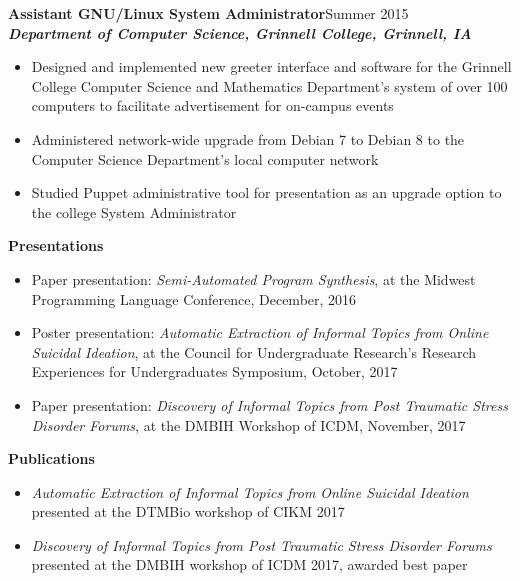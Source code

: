 \documentclass[9pt]{extarticle}
\begin{document}
\textbf{Assistant GNU/Linux System Administrator}\hfill Summer 2015\\
\textbf{\textit{Department of Computer Science, Grinnell College, Grinnell, IA}}
\begin{itemize}
\item Designed and implemented new greeter interface and 
  software for the Grinnell College Computer Science 
  and Mathematics Department's system of over 100 computers to 
  facilitate advertisement for on-campus events
\item Administered network-wide upgrade from Debian 7 to Debian 8 to
  the Computer Science Department's local computer network
\item Studied Puppet administrative tool for presentation as an upgrade option to the college System Administrator
\end{itemize}
\vspace{0.4cm}

\begin{large}
\begin{center}\textbf{Presentations}
\end{center}
\end{large}
\begin{itemize}
\item Paper presentation: \textit{Semi-Automated Program Synthesis}, at the Midwest Programming Language Conference,
  December, 2016
\item Poster presentation: \textit{Automatic
  Extraction of Informal Topics from Online Suicidal Ideation}, at the Council for Undergraduate Research's 
  Research Experiences for Undergraduates Symposium, October, 2017
\item Paper presentation: \textit{Discovery of Informal Topics from Post Traumatic Stress
  Disorder Forums}, at the DMBIH Workshop of ICDM, November, 2017
\end{itemize}

\begin{large}
\begin{center}\textbf{Publications}
\end{center}
\end{large}
\begin{itemize}
\item \textit{Automatic
  Extraction of Informal Topics from Online Suicidal Ideation} presented at the
  DTMBio workshop of CIKM 2017
\item \textit{Discovery of Informal Topics from Post Traumatic Stress
  Disorder Forums} presented at the DMBIH workshop of ICDM 2017,
awarded best paper 
\end{itemize}
\vspace{0.4cm}
\end{document}
